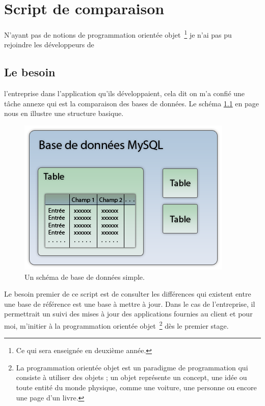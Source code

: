 \chapter{Script de comparaison} %
\label{cha:Script de comparaison}

N'ayant pas de notions de programmation orientée objet\, \footnote{Ce qui sera
enseignée en deuxième année.} je n'ai pas pu rejoindre les développeurs de
\section{Le besoin} %
\label{sec:Le besoin}

l'entreprise dans l'application qu'ils développaient, cela dit on m'a confié
une tâche annexe qui est la comparaison des bases de données. Le schéma
\ref{bdd} en page \pageref{bdd} nous en illustre une structure basique.

\begin{figure}
\begin{center}
\includegraphics[scale=0.5]{images/bdd.png}
\end{center}
\caption{Un schéma de base de données simple.}
\label{bdd}
\end{figure}

Le besoin premier de ce script est de consulter les différences qui existent
entre une base de référence est une base à mettre à jour. Dans le cas de
l'entreprise, il permettrait un suivi des mises à jour des applications
fournies au client et pour moi, m'initier à la programmation orientée objet\,
\footnote{La programmation orientée objet est un paradigme de programmation qui
consiste à utiliser des objets ; un objet représente un concept, une idée ou
toute entité du monde physique, comme une voiture, une personne ou encore une
page d'un livre.} dès le premier stage.
